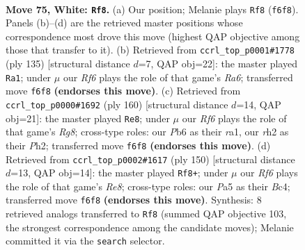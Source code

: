 \documentclass[11pt]{article}
\begin{document}
\clearpage

\begin{figure}[p]\centering
\begin{subfigure}{0.46\textwidth}\centering
\resizebox{\linewidth}{!}{%
\newchessgame
\chessboard[
  setfen={8/7k/1P3R1n/P7/8/1K6/7r/8 w - - 13 75},
  showmover=false,
  pgfstyle=straightmove, color=movearrow, markmove={f6-f8}
]}
\caption{}
\end{subfigure}\hfill
\begin{subfigure}{0.46\textwidth}\centering
\resizebox{\linewidth}{!}{%
\newchessgame
\chessboard[
  setfen={8/p4k2/2R5/8/7p/r1N5/5K2/8 b - - 13 68},
  showmover=false,
  pgfstyle=straightmove, color=movearrow, markmove={a3-a1}
]}
\caption{}
\end{subfigure}
\\[4pt]
\begin{subfigure}{0.46\textwidth}\centering
\resizebox{\linewidth}{!}{%
\newchessgame
\chessboard[
  setfen={6R1/8/6n1/7k/2N5/6K1/7P/r7 w - - 15 81},
  showmover=false,
  pgfstyle=straightmove, color=movearrow, markmove={g8-e8}
]}
\caption{}
\end{subfigure}\hfill
\begin{subfigure}{0.46\textwidth}\centering
\resizebox{\linewidth}{!}{%
\newchessgame
\chessboard[
  setfen={4R3/2r1n3/5k2/1P6/2B1K3/8/8/8 w - - 7 76},
  showmover=false,
  pgfstyle=straightmove, color=movearrow, markmove={e8-f8}
]}
\caption{}
\end{subfigure}
\caption{\textbf{Move 75, White: \texttt{Rf8}.} (a) Our position; Melanie plays \texttt{Rf8} (\texttt{f6f8}). Panels (b)--(d) are the retrieved master positions whose correspondence most drove this move (highest QAP objective among those that transfer to it). (b) Retrieved from \texttt{ccrl\_top\_p0001\#1778} (ply 135) [structural distance $d$=7, QAP obj=22]: the master played \texttt{Ra1}; under $\mu$ our \emph{Rf6} plays the role of that game's \emph{Ra6}; transferred move \texttt{f6f8} \textbf{(endorses this move)}. (c) Retrieved from \texttt{ccrl\_top\_p0000\#1692} (ply 160) [structural distance $d$=14, QAP obj=21]: the master played \texttt{Re8}; under $\mu$ our \emph{Rf6} plays the role of that game's \emph{Rg8}; cross-type roles: our \emph{P}b6 as their \emph{r}a1, our \emph{r}h2 as their \emph{P}h2; transferred move \texttt{f6f8} \textbf{(endorses this move)}. (d) Retrieved from \texttt{ccrl\_top\_p0002\#1617} (ply 150) [structural distance $d$=13, QAP obj=14]: the master played \texttt{Rf8+}; under $\mu$ our \emph{Rf6} plays the role of that game's \emph{Re8}; cross-type roles: our \emph{P}a5 as their \emph{B}c4; transferred move \texttt{f6f8} \textbf{(endorses this move)}. Synthesis: 8 retrieved analogs transferred to \texttt{Rf8} (summed QAP objective 103, the strongest correspondence among the candidate moves); Melanie committed it via the \texttt{search} selector.}
\label{fig:thought-m148}
\end{figure}
\end{document}
